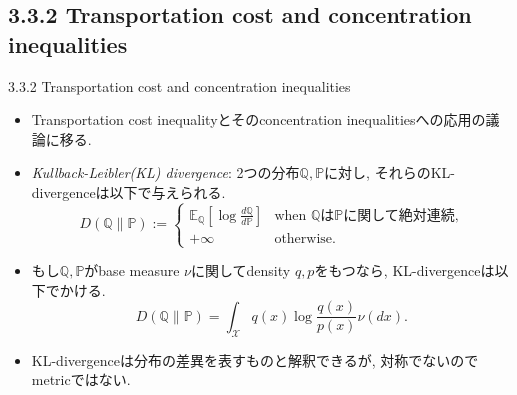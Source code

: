 \documentclass[aspectratio=169, dvipdfmx]{beamer}
\newcommand{\ex}{\mathbb{E}}
\newcommand{\bb}{\mathbb}
\newcommand{\cc}{\mathcal}
\begin{document}
\subsection{3.3.2 Transportation cost and concentration inequalities}
\begin{frame}{3.3.2 Transportation cost and concentration inequalities}
\begin{itemize}
    \item Transportation cost inequalityとそのconcentration inequalitiesへの応用の議論に移る.
    \item {\it Kullback-Leibler(KL) divergence}:
            2つの分布$\bb{Q},\bb{P}$に対し, それらのKL-divergenceは以下で与えられる.
            \[
                D(\bb{Q}\|\bb{P}) :=
                \begin{cases}
                    \ex_{\bb{Q}}\left[\log \frac{d\bb{Q}}{d\bb{P}}\right]
                    & \text{when $\bb{Q}$は$\bb{P}$に関して絶対連続,}\\
                    + \infty
                    & \text{otherwise.}
                \end{cases}
                \tag{3.56}\label{3.56}
            \]
    \item もし$\bb{Q}, \bb{P}$がbase measure $\nu$に関してdensity $q, p$をもつなら,
    KL-divergenceは以下でかける.
    \[
        D(\bb{Q}\|\bb{P}) = \int_{\cc{X}}q(x)\log\frac{q(x)}{p(x)}\nu(dx).
        \tag{3.57}\label{3.57}
    \]
    \item KL-divergenceは分布の差異を表すものと解釈できるが,
    対称でないのでmetricではない.
\end{itemize}
\end{frame}
\end{document}
